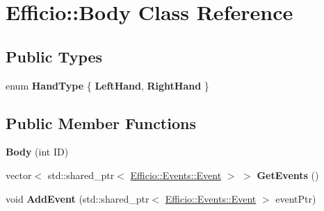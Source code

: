 \hypertarget{class_efficio_1_1_body}{}\section{Efficio\+:\+:Body Class Reference}
\label{class_efficio_1_1_body}
\subsection*{Public Types}
\begin{DoxyCompactItemize}
\item 
enum {\bfseries Hand\+Type} \{ {\bfseries Left\+Hand}, 
{\bfseries Right\+Hand}
 \}\hypertarget{class_efficio_1_1_body_a205e9fd8ff578f62c2aac4c654d60d11}{}\label{class_efficio_1_1_body_a205e9fd8ff578f62c2aac4c654d60d11}

\end{DoxyCompactItemize}
\subsection*{Public Member Functions}
\begin{DoxyCompactItemize}
\item 
{\bfseries Body} (int ID)\hypertarget{class_efficio_1_1_body_a9590bede3bfa02bb53878cd3dcf9143e}{}\label{class_efficio_1_1_body_a9590bede3bfa02bb53878cd3dcf9143e}

\item 
vector$<$ std\+::shared\+\_\+ptr$<$ \hyperlink{class_efficio_1_1_events_1_1_event}{Efficio\+::\+Events\+::\+Event} $>$ $>$ {\bfseries Get\+Events} ()\hypertarget{class_efficio_1_1_body_a4fc4cd582563185ea556809253ed4992}{}\label{class_efficio_1_1_body_a4fc4cd582563185ea556809253ed4992}

\item 
void {\bfseries Add\+Event} (std\+::shared\+\_\+ptr$<$ \hyperlink{class_efficio_1_1_events_1_1_event}{Efficio\+::\+Events\+::\+Event} $>$ event\+Ptr)\hypertarget{class_efficio_1_1_body_aeacb5c899f96598b123a433c36c913f2}{}\label{class_efficio_1_1_body_aeacb5c899f96598b123a433c36c913f2}

\end{DoxyCompactItemize}
